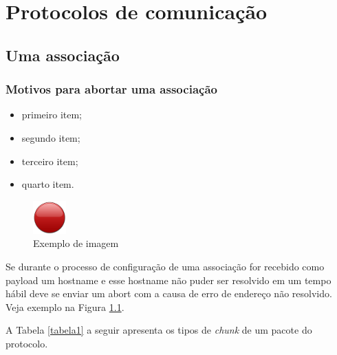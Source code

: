 \chapter{Protocolos de comunicação} \label{capitulo2}


\section{Uma associação}

\lipsum[1-3] 


\subsection{Motivos para abortar uma associação}

\begin{itemize}
	\item primeiro item;
	\item segundo item;
	\item terceiro item;
	\item quarto item.
\end{itemize}

\begin{figure}[h]
	\centering
	\includegraphics[scale=0.8]{imagens/red.png}
	\caption{Exemplo de imagem}
	\label{imagem1}
\end{figure}


Se durante o processo de configuração de uma associação for recebido como payload um hostname e esse hostname não puder ser resolvido em um tempo hábil deve se enviar um abort com a causa de erro de endereço não resolvido. Veja exemplo na Figura \ref{imagem1}.


\lipsum[1-4] 

A Tabela \ref{tabela1} a seguir apresenta os tipos de \textit{chunk} de um pacote do protocolo.

